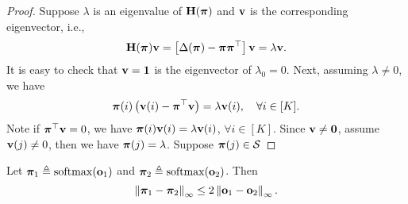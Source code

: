 \begin{proof}
Suppose $\lambda$ is an eigenvalue of ${\mathbf{H}}({\boldsymbol{\pi}})$ and ${\mathbf{v}}$ is the corresponding eigenvector, i.e.,
\begin{equation*}
    {\mathbf{H}}({\boldsymbol{\pi}}) {\mathbf{v}} = \left[ \Delta({\boldsymbol{\pi}}) - {\boldsymbol{\pi}}{\boldsymbol{\pi}}^\top \right] {\mathbf{v}} = \lambda {\mathbf{v}}.
\end{equation*}
It is easy to check that ${\mathbf{v}} = {\mathbf{1}}$ is the eigenvector of $\lambda_0 = 0$. Next, assuming $\lambda \not= 0$, we have
\begin{equation*}
    {\boldsymbol{\pi}}(i) \left( {\mathbf{v}}(i) - {\boldsymbol{\pi}}^\top {\mathbf{v}} \right) = \lambda {\mathbf{v}}(i), \quad \forall i \in [K].
\end{equation*}
Note if ${\boldsymbol{\pi}}^\top {\mathbf{v}} = 0$, we have ${\boldsymbol{\pi}}(i) {\mathbf{v}}(i) = \lambda {\mathbf{v}}(i)$, $\forall i \in [K]$. Since ${\mathbf{v}} \not= {\mathbf{0}}$, assume ${\mathbf{v}}(j) \not= 0$, then we have ${\boldsymbol{\pi}}(j) = \lambda$. Suppose ${\boldsymbol{\pi}}(j) \in {\mathcal{S}}$
\end{proof}

\begin{lem}
Let ${\boldsymbol{\pi}}_1 \triangleq \mathrm{softmax}({\mathbf{o}}_1)$ and ${\boldsymbol{\pi}}_2 \triangleq \mathrm{softmax}({\mathbf{o}}_2)$. Then
\begin{equation*}
    \left\| {\boldsymbol{\pi}}_1 - {\boldsymbol{\pi}}_2 \right\|_\infty \le  2 \left\| {\mathbf{o}}_1 - {\mathbf{o}}_2 \right\|_\infty.
\end{equation*}
\end{lem}